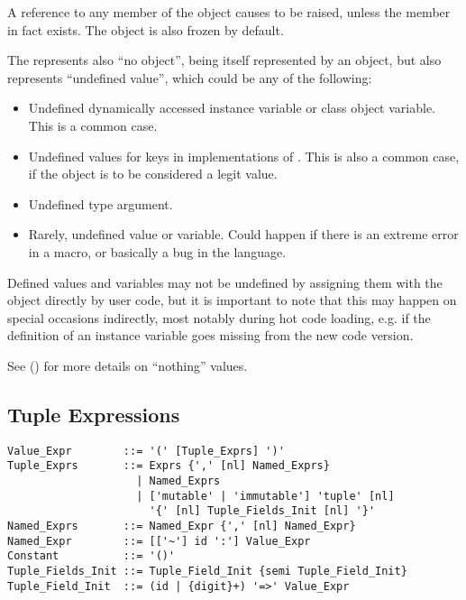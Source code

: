 A reference to any member of the  object causes  to be raised, unless the member in fact exists. The  object is also frozen by default. 

The  represents also ``no object'', being itself represented by an object, but also represents ``undefined value'', which could be any of the following:
\begin{itemize}
  \item Undefined dynamically accessed instance variable or class object variable. This is a common case. 
  \item Undefined values for keys in implementations of . This is also a common case, if the  object is to be considered a legit value. 
  \item Undefined type argument.
  \item Rarely, undefined value or variable. Could happen if there is an extreme error in a macro, or basically a bug in the language. 
\end{itemize}

Defined values and variables may not be undefined by assigning them with the  object directly by user code, but it is important to note that this may happen on special occasions indirectly, most notably during hot code loading, e.g. if the definition of an instance variable goes missing from the new code version. 

See () for more details on ``nothing'' values. 





\subsection{Tuple Expressions}
\label{sec:tuples}

\syntax\begin{lstlisting}
Value_Expr        ::= '(' [Tuple_Exprs] ')'
Tuple_Exprs       ::= Exprs {',' [nl] Named_Exprs}
                    | Named_Exprs
                    | ['mutable' | 'immutable'] 'tuple' [nl] 
                      '{' [nl] Tuple_Fields_Init [nl] '}'
Named_Exprs       ::= Named_Expr {',' [nl] Named_Expr}
Named_Expr        ::= [['~'] id ':'] Value_Expr
Constant          ::= '()'
Tuple_Fields_Init ::= Tuple_Field_Init {semi Tuple_Field_Init}
Tuple_Field_Init  ::= (id | {digit}+) '=>' Value_Expr
\end{lstlisting}

